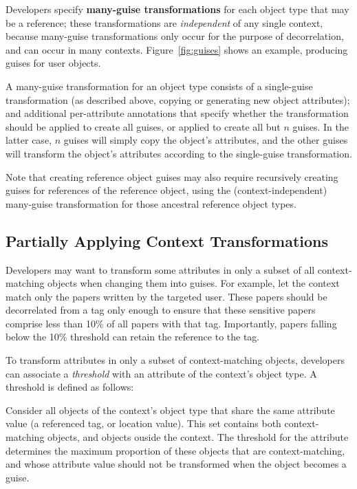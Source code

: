 %
Developers specify \textbf{many-guise transformations} for each object type that may be a reference;
these transformations are \emph{independent} of any single context, because many-guise
transformations only occur for the purpose of decorrelation, and can occur in many contexts.
%
Figure~\ref{fig:guises} shows an example, producing guises for user objects.

A many-guise transformation for an object type consists of a single-guise transformation (as
described above, \ie copying or generating new object attributes); and additional per-attribute
annotations that specify whether the transformation should be applied to create all guises, or
applied to create all but $n$ guises. In the latter case, $n$ guises will simply copy the
object's attributes, and the other guises will transform the object's attributes according to the
single-guise transformation.

Note that creating reference object guises may also require recursively creating guises for references of
the reference object, using the (context-independent) many-guise transformation for those ancestral reference
object types.

\subsection{Partially Applying Context Transformations}
\label{sec:threshold} 

Developers may want to transform some attributes in only a subset of all context-matching objects when
changing them into guises. 
For example, let the context match only the papers written by the targeted user. These papers should
be decorrelated from a tag only enough to ensure that these sensitive papers comprise less than 10\%
of all papers with that tag. Importantly, papers falling below the 10\% threshold can retain the
reference to the tag.

To transform attributes in only a subset of context-matching objects, developers can associate a
\emph{threshold} with an attribute of the context's object type.  A threshold is defined as follows:

Consider all objects of the context's object type that share the same attribute value (\eg a
referenced tag, or location value). This set contains both context-matching objects, and objects
ouside the context. The threshold for the attribute determines the maximum proportion of these
objects that are context-matching, and whose attribute value should not be transformed when the
object becomes a guise.


